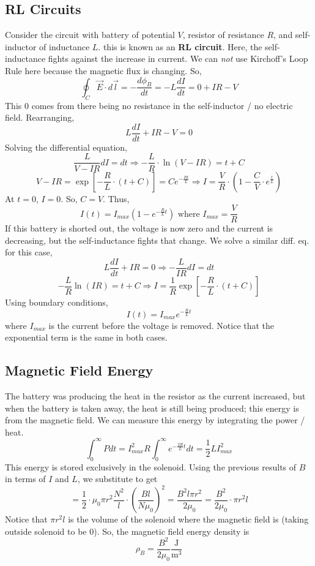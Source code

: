 \documentclass{article}
\begin{document}
\subsection{RL Circuits}
Consider the circuit with battery of potential $V$, resistor of resistance $R$, and self-inductor of inductance $L$.
this is known as an \textbf{RL circuit}.
Here, the self-inductance fights against the increase in current.
We can {\it not} use Kirchoff's Loop Rule here because the magnetic flux is changing. So,
$$\oint_{C}\vec{E}\cdot d\vec{l}=-\frac{d\phi_{B}}{dt}=-L\frac{dI}{dt}=0+IR-V$$
This $0$ comes from there being no resistance in the self-inductor / no electric field. Rearranging,
$$L\frac{dI}{dt}+IR-V=0$$
Solving the differential equation, 
$$\frac{L}{V-IR}dI=dt\Rightarrow -\frac{L}{R}\cdot \ln(V-IR)=t+C$$
$$V-IR=\exp\left[-\frac{R}{L}\cdot (t+C)\right]=Ce^{-\frac{Rt}{L}}\Rightarrow
I=\frac{V}{R}\cdot (1-\frac{C}{V}\cdot e^{\frac{t}{L}})$$
At $t=0$, $I=0$. So, $C=V$. Thus,
$$I(t)=I_{max}\left(1-e^{-\frac{R}{L}t}\right)\text{ where } I_{max}=\frac{V}{R}$$
If this battery is shorted out, the voltage is now zero and the current is decreasing, but the self-inductance fights that change.
We solve a similar diff. eq. for this case,
$$L\frac{dI}{dt}+IR=0\Rightarrow -\frac{L}{IR}dI=dt$$
$$-\frac{L}{R}\ln(IR)=t+C\Rightarrow I=\frac{1}{R}\exp\left[-\frac{R}{L}\cdot (t+C)\right]$$
Using boundary conditions,
$$I(t)=I_{max}e^{-\frac{R}{L}t}$$
where $I_{max}$ is the current before the voltage is removed. Notice that the exponential term is the same in both cases.

\subsection{Magnetic Field Energy}
The battery was producing the heat in the resistor as the current increased, but when the battery is taken away,
the heat is still being produced; this energy is from the magnetic field. We can measure this energy by integrating the 
power / heat.
$$\int_{0}^{\infty}Pdt=I_{max}^{2}R\int_{0}^{\infty}e^{-\frac{2R}{L}t}dt=\frac{1}{2}LI_{max}^{2}$$
This energy is stored exclusively in the solenoid. Using the previous results of $B$ in terms of $I$ and $L$, we substitute to get
$$=\frac{1}{2}\cdot \mu_{0}\pi r^{2}\frac{N^{2}}{l}\cdot \left(\frac{Bl}{N\mu_{0}}\right)^{2}
=\frac{B^{2}l\pi r^{2}}{2\mu_{0}}=\frac{B^{2}}{2\mu_{0}}\cdot \pi r^{2}l
$$
Notice that $\pi r^{2}l$ is the volume of the solenoid where the magnetic field is (taking outside solenoid to be $0$). So,
the magnetic field energy density is
$$\rho_{B}=\frac{B^{2}}{2\mu_{0}} \frac{\text{J}}{\text{m}^{3}}$$
\end{document}
